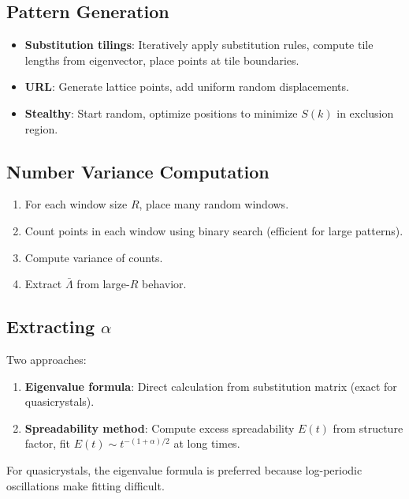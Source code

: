 \documentclass[11pt,letterpaper]{article}
\begin{document}
\subsection{Pattern Generation}

\begin{itemize}
    \item \textbf{Substitution tilings}: Iteratively apply substitution rules, compute tile lengths from eigenvector, place points at tile boundaries.

    \item \textbf{URL}: Generate lattice points, add uniform random displacements.

    \item \textbf{Stealthy}: Start random, optimize positions to minimize $S(k)$ in exclusion region.
\end{itemize}

\subsection{Number Variance Computation}

\begin{enumerate}
    \item For each window size $R$, place many random windows.
    \item Count points in each window using binary search (efficient for large patterns).
    \item Compute variance of counts.
    \item Extract $\bar{\Lambda}$ from large-$R$ behavior.
\end{enumerate}

\subsection{Extracting $\alpha$}

Two approaches:
\begin{enumerate}
    \item \textbf{Eigenvalue formula}: Direct calculation from substitution matrix (exact for quasicrystals).

    \item \textbf{Spreadability method}: Compute excess spreadability $E(t)$ from structure factor, fit $E(t) \sim t^{-(1+\alpha)/2}$ at long times.
\end{enumerate}

For quasicrystals, the eigenvalue formula is preferred because log-periodic oscillations make fitting difficult.
\end{document}
